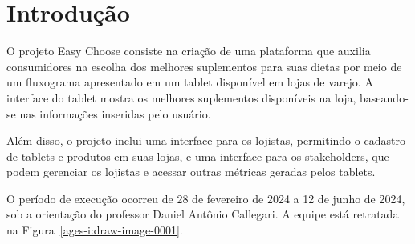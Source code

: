 \hypertarget{_Toc45627143}{}
\hypertarget{__RefHeading___Toc4802_3790000799}{}
\section{Introdução}
\label{ages-i:text-h-0003}

\indent \originaltab{}O projeto Easy Choose consiste na criação de uma plataforma que auxilia consumidores na escolha dos melhores suplementos para suas dietas por meio de um fluxograma apresentado em um tablet disponível em lojas de varejo. A interface do tablet mostra os melhores suplementos disponíveis na loja, baseando-se nas informações inseridas pelo usuário.\par

\indent \originaltab{}Além disso, o projeto inclui uma interface para os lojistas, permitindo o cadastro de tablets e produtos em suas lojas, e uma interface para os stakeholders, que podem gerenciar os lojistas e acessar outras métricas geradas pelos tablets.\originalspace{}\par

\indent \originaltab{}O período de execução ocorreu de 28 de fevereiro de 2024 a 12 de junho de 2024, sob a orientação do professor Daniel Antônio Callegari. A equipe está retratada na Figura~\ref{ages-i:draw-image-0001}.\par

